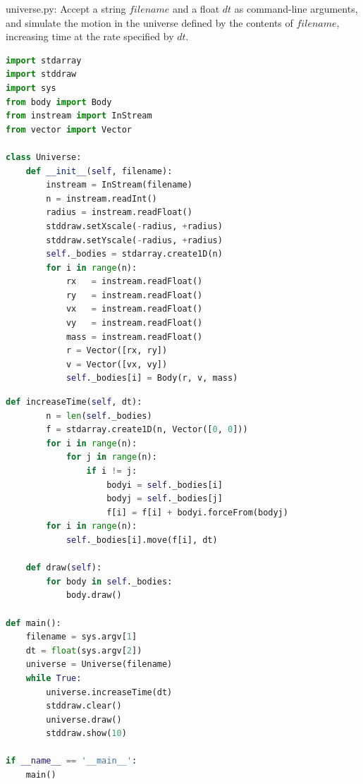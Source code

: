 \documentclass[8pt,a4paper,compress]{beamer}
\begin{document}
\begin{frame}[fragile]
\pause

\begin{framed}
\tiny universe.py: Accept a string $filename$ and a float $dt$ as command-line arguments, and simulate the motion in the universe defined by the contents of $filename$, increasing time at the rate specified by $dt$.
\end{framed}

\begin{lstlisting}[language=python,style=focusin]
import stdarray
import stddraw
import sys
from body import Body 
from instream import InStream
from vector import Vector

class Universe:
    def __init__(self, filename):
        instream = InStream(filename)
        n = instream.readInt()
        radius = instream.readFloat()
        stddraw.setXscale(-radius, +radius)
        stddraw.setYscale(-radius, +radius)
        self._bodies = stdarray.create1D(n)
        for i in range(n):
            rx   = instream.readFloat()
            ry   = instream.readFloat()
            vx   = instream.readFloat()
            vy   = instream.readFloat()
            mass = instream.readFloat()
            r = Vector([rx, ry])
            v = Vector([vx, vy])
            self._bodies[i] = Body(r, v, mass)
\end{lstlisting}
\end{frame}

\begin{frame}[fragile]
\pause

\begin{lstlisting}[language=python,style=focusin]
    def increaseTime(self, dt):
        n = len(self._bodies)
        f = stdarray.create1D(n, Vector([0, 0]))
        for i in range(n):
            for j in range(n):
                if i != j:
                    bodyi = self._bodies[i]
                    bodyj = self._bodies[j]
                    f[i] = f[i] + bodyi.forceFrom(bodyj)
        for i in range(n):
            self._bodies[i].move(f[i], dt)    

    def draw(self):
        for body in self._bodies:
            body.draw()

def main():
    filename = sys.argv[1]
    dt = float(sys.argv[2])
    universe = Universe(filename)
    while True:
        universe.increaseTime(dt)
        stddraw.clear()
        universe.draw()
        stddraw.show(10)

if __name__ == '__main__':
    main()
\end{lstlisting}
\end{frame}
\end{document}

